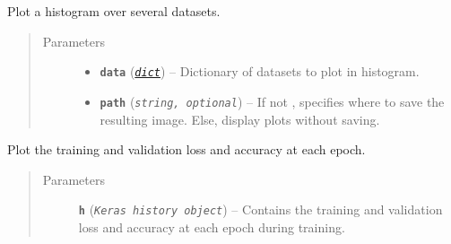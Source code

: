 \documentclass[letterpaper,10pt,english]{sphinxmanual}
\begin{document}

\begin{fulllineitems}
\label{snntoolbox.io_utils:snntoolbox.io_utils.plotting.plot_hist_combined}
Plot a histogram over several datasets.
\begin{quote}\begin{description}
\item[{Parameters}] \leavevmode\begin{itemize}
\item {} 
\textbf{\texttt{data}} (\href{https://docs.python.org/library/stdtypes.html\#dict}{\emph{\texttt{dict}}}) -- Dictionary of datasets to plot in histogram.

\item {} 
\textbf{\texttt{path}} (\emph{\texttt{string, optional}}) -- If not , specifies where to save the resulting image. Else,
display plots without saving.

\end{itemize}

\end{description}\end{quote}

\end{fulllineitems}


\begin{fulllineitems}
\label{snntoolbox.io_utils:snntoolbox.io_utils.plotting.plot_history}
Plot the training and validation loss and accuracy at each epoch.
\begin{quote}\begin{description}
\item[{Parameters}] \leavevmode
\textbf{\texttt{h}} (\emph{\texttt{Keras history object}}) -- Contains the training and validation loss and accuracy at each epoch
during training.

\end{description}\end{quote}

\end{fulllineitems}

\end{document}
